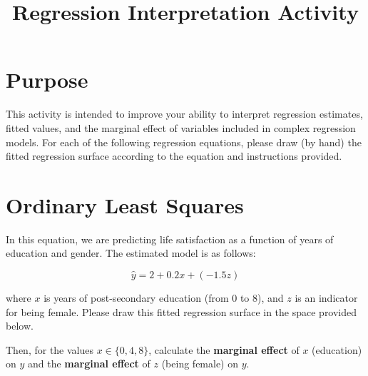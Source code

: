 \documentclass[a4paper,12pt]{article}
\title{Regression Interpretation Activity}
\author{}
\date{}
\begin{document}
	
\maketitle

\vspace{-2em}
	
\section*{Purpose}

This activity is intended to improve your ability to interpret regression estimates, fitted values, and the marginal effect of variables included in complex regression models. For each of the following regression equations, please draw (by hand) the fitted regression surface according to the equation and instructions provided.

\section{Ordinary Least Squares}

In this equation, we are predicting life satisfaction as a function of years of education and gender. The estimated model is as follows:

\begin{equation}
\hat{y} = 2 + 0.2 x + (-1.5 z)
\end{equation}

\noindent where $x$ is years of post-secondary education (from 0 to 8), and $z$ is an indicator for being female. Please draw this fitted regression surface in the space provided below. 

\begin{center}
\end{center}

\noindent Then, for the values $x \in \{0,4,8\}$, calculate the \textbf{marginal effect} of $x$ (education) on $y$ and the \textbf{marginal effect} of $z$ (being female) on $y$.
\end{document}
